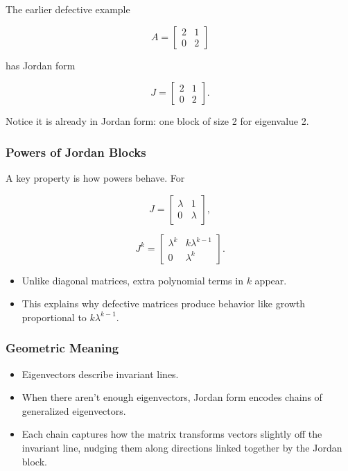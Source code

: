 \documentclass[
  letterpaper,
  DIV=11,
  numbers=noendperiod]{scrreprt}
\providecommand{\tightlist}{%
  \setlength{\itemsep}{0pt}\setlength{\parskip}{0pt}}
\begin{document}
The earlier defective example

\[
A = \begin{bmatrix} 2 & 1 \\ 0 & 2 \end{bmatrix}
\]

has Jordan form

\[
J = \begin{bmatrix} 2 & 1 \\ 0 & 2 \end{bmatrix}.
\]

Notice it is already in Jordan form: one block of size 2 for eigenvalue
2.

\subsubsection{Powers of Jordan Blocks}\label{powers-of-jordan-blocks}

A key property is how powers behave. For

\[
J = \begin{bmatrix} \lambda & 1 \\ 0 & \lambda \end{bmatrix},
\]

\[
J^k = \begin{bmatrix} \lambda^k & k\lambda^{k-1} \\ 0 & \lambda^k \end{bmatrix}.
\]

\begin{itemize}
\tightlist
\item
  Unlike diagonal matrices, extra polynomial terms in \(k\) appear.
\item
  This explains why defective matrices produce behavior like growth
  proportional to \(k \lambda^{k-1}\).
\end{itemize}

\subsubsection{Geometric Meaning}\label{geometric-meaning-14}

\begin{itemize}
\tightlist
\item
  Eigenvectors describe invariant lines.
\item
  When there aren't enough eigenvectors, Jordan form encodes chains of
  generalized eigenvectors.
\item
  Each chain captures how the matrix transforms vectors slightly off the
  invariant line, nudging them along directions linked together by the
  Jordan block.
\end{itemize}
\end{document}
